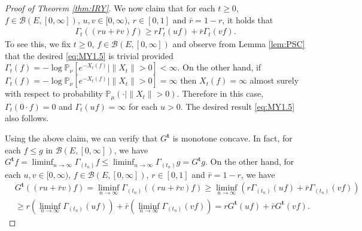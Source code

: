 \documentclass[12pt,a4paper]{amsart}
\numberwithin{equation}{section}
\theoremstyle{plain}
\theoremstyle{definition}
\begin{document}
\begin{proof}[Proof of Theorem \ref{thm:IRY}]
We now claim that for each $t\geq 0$, $f\in \mathcal B(E,[0,\infty])$, $u,v \in [0,\infty)$, $r\in [0,1]$ and $\bar r = 1 - r$, it holds that
\begin{align}
  \label{eq:MY1.5}
\Gamma_t((ru+\bar r v)f) 
 \geq r \Gamma_t (uf) + \bar r \Gamma_t (vf).
\end{align}
To see this, we fix $t\geq 0$, $f\in \mathcal B(E,[0,\infty])$ and observe from Lemma \ref{lem:PSC} that the desired \eqref{eq:MY1.5} is trivial provided $\Gamma_t(f) = - \log \mathbb P_\nu[e^{-X_t(f)}|\|X_t\|>0]< \infty$. 
On the other hand, if $\Gamma_t(f) = - \log \mathbb P_\nu[e^{-X_t(f)}|\|X_t\|>0] = \infty$ then $X_t(f) = \infty$ almost surely with respect to probability $\mathbb P_\mu(\cdot | \|X_t\|>0)$. 
Therefore in this case, $\Gamma_t(0\cdot f) = 0$ and $\Gamma_t(uf) = \infty$ for each $u > 0$. 
The desired result \eqref{eq:MY1.5} also follows.

Using the above claim, we can verify that $G^\mathbf t$ is monotone concave.
In fact, for each $f \leq g$ in $\mathcal B(E,[0,\infty])$, we have
\(	
G^{\mathbf t} f = \liminf_{n\to \infty} \Gamma_{(t_n)} f
  \leq \liminf_{n\to \infty} \Gamma_{(t_n)} g
  = G^{\mathbf t} g.
  \)
On the other hand, for each $u,v \in [0,\infty)$, $f\in \mathcal B(E,[0,\infty])$, $r \in [0,1]$ and $\bar r = 1 - r$, we have
\begin{align}
	& G^{\mathbf t}((ru + \bar rv)f)
   = \liminf_{n \to \infty} \Gamma_{(t_n)}((ru + \bar rv)f)
   \geq \liminf_{n\to \infty} (r\Gamma_{(t_n)} (uf) + \bar r\Gamma_{(t_n)}(vf)) \\
  & \geq r (\liminf_{n\to \infty} \Gamma_{(t_n)} (uf)) + \bar r (\liminf_{n\to \infty} \Gamma_{(t_n)}(vf) ) 
    = r G^{\mathbf t} (uf) + \bar r G^{\mathbf t}(vf).
\end{align}


\end{proof}
\end{document}
